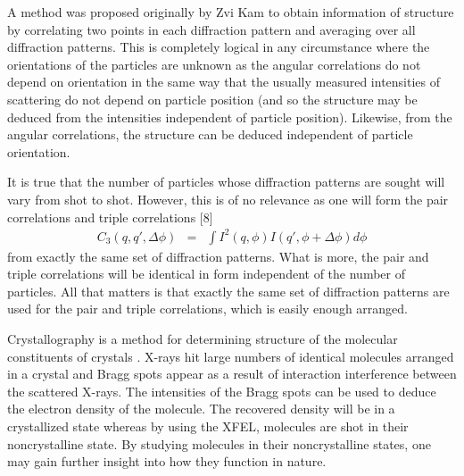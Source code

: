 A method was proposed originally by Zvi Kam \cite{kam1978} to obtain information of structure by correlating two points in each diffraction pattern and averaging over all diffraction patterns. This is completely logical in any circumstance where the orientations of the particles are unknown as the angular correlations do not depend on orientation in the same way that the usually measured intensities of scattering do not depend on particle position (and so the structure may be deduced from the intensities independent of particle position). Likewise, from the angular correlations, the structure can be deduced independent of particle orientation.

It is true that the number of particles whose diffraction patterns are sought will vary from shot to shot. However, this is of no relevance as one will form the pair correlations and triple correlations [8]
\begin{eqnarray}
C_{3}(q,q',\Delta \phi) &=& \int I^{2}(q,\phi) I(q',\phi+\Delta \phi)  d\phi
\end{eqnarray}
from exactly the same set of diffraction patterns. What is more, the pair and triple correlations will be identical in form independent of the number of particles. All that matters is that exactly the same set of diffraction patterns are used for the pair and triple correlations, which is easily enough arranged.

Crystallography is a method for determining structure of the molecular constituents of crystals \cite{Drenth}. X-rays hit large numbers of identical molecules arranged in a crystal and Bragg spots appear as a result of interaction interference between the scattered X-rays. The intensities of the Bragg spots can be used to deduce the electron density of the molecule. The recovered density will be in a crystallized state whereas by using the XFEL, molecules are shot in their noncrystalline state. By studying molecules in their noncrystalline states, one may gain further insight into how they function in nature. 

